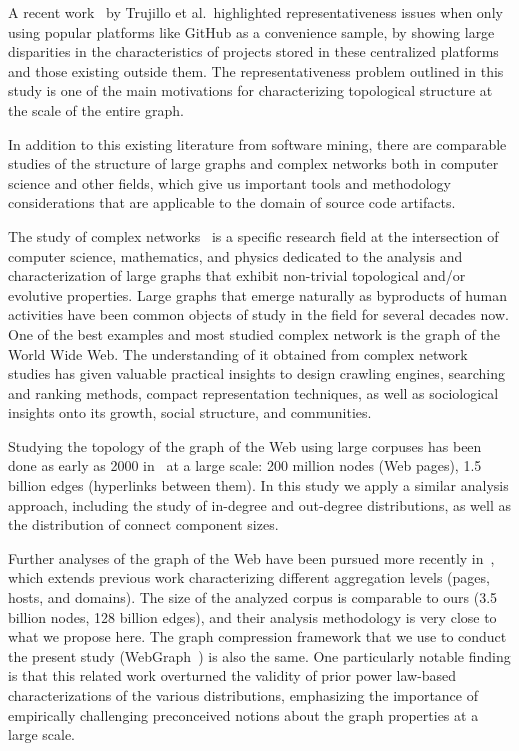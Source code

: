 A recent work~\cite{trujillo2021penumbra} by Trujillo et al.\ highlighted
representativeness issues when only using popular platforms like GitHub as a
convenience sample, by showing large disparities in the characteristics of
projects stored in these centralized platforms and those existing outside them.
The representativeness problem outlined in this study is one of the main
motivations for characterizing topological structure at the scale of the entire
graph.

In addition to this existing literature from software mining, there are
comparable studies of the structure of large graphs and complex networks both
in computer science and other fields, which give us important tools and
methodology considerations that are applicable to the domain of source code
artifacts.

The study of complex networks~\cite{barabasi2002networkstats,
  barabasi2003scalefree} is a specific research field at the intersection of
computer science, mathematics, and physics dedicated to the analysis and
characterization of large graphs that exhibit non-trivial topological and/or
evolutive properties. Large graphs that emerge naturally as byproducts of human
activities have been common objects of study in the field for several decades
now.
One of the best examples and most studied complex network is the graph of the
World Wide Web. The understanding of it obtained from complex network studies
has given valuable practical insights to design crawling engines, searching and
ranking methods, compact representation techniques, as well as sociological
insights onto its growth, social structure, and communities.

Studying the topology of the graph of the Web using large corpuses has been
done as early as 2000 in~\cite{broder2000graph} at a large scale: 200 million
nodes (Web pages), 1.5 billion edges (hyperlinks between them). In this study
we apply a similar analysis approach, including the study of in-degree and
out-degree distributions, as well as the distribution of connect component
sizes.

Further analyses of the graph of the Web have been pursued more recently
in~\cite{vigna2015webstruct}, which extends previous work characterizing
different aggregation levels (pages, hosts, and domains). The size of the
analyzed corpus is comparable to ours (3.5 billion nodes, 128 billion edges),
and their analysis methodology is very close to what we propose here. The graph
compression framework that we use to conduct the present study
(WebGraph~\cite{boldi-vigna-webgraph-1, boldi-vigna-webgraph-2}) is also the
same. One particularly notable finding is that this related work overturned the
validity of prior power law-based characterizations of the various
distributions, emphasizing the importance of empirically challenging
preconceived notions about the graph properties at a large scale.

